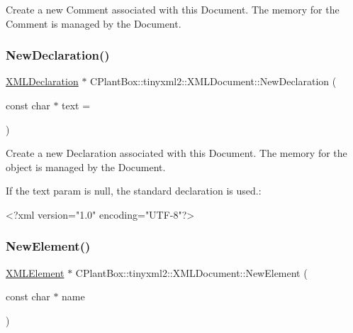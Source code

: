 Create a new Comment associated with this Document. The memory for the Comment is managed by the Document. \mbox{\label{classCPlantBox_1_1tinyxml2_1_1XMLDocument_af1f51f94b8132e17fad999cf402dcef6}} 
\subsubsection{\texorpdfstring{New\+Declaration()}{NewDeclaration()}}
{\footnotesize\ttfamily \hyperlink{classCPlantBox_1_1tinyxml2_1_1XMLDeclaration}{X\+M\+L\+Declaration} $\ast$ C\+Plant\+Box\+::tinyxml2\+::\+X\+M\+L\+Document\+::\+New\+Declaration (\begin{DoxyParamCaption}\item[{const char $\ast$}]{text = {} }\end{DoxyParamCaption})}

Create a new Declaration associated with this Document. The memory for the object is managed by the Document.

If the \textquotesingle{}text\textquotesingle{} param is null, the standard declaration is used.\+: \begin{DoxyVerb}    <?xml version="1.0" encoding="UTF-8"?>
\end{DoxyVerb}
 \mbox{\label{classCPlantBox_1_1tinyxml2_1_1XMLDocument_a6deb964be32cf8fb1561af04dc572f97}} 
\subsubsection{\texorpdfstring{New\+Element()}{NewElement()}}
{\footnotesize\ttfamily \hyperlink{classCPlantBox_1_1tinyxml2_1_1XMLElement}{X\+M\+L\+Element} $\ast$ C\+Plant\+Box\+::tinyxml2\+::\+X\+M\+L\+Document\+::\+New\+Element (\begin{DoxyParamCaption}\item[{const char $\ast$}]{name }\end{DoxyParamCaption})}

